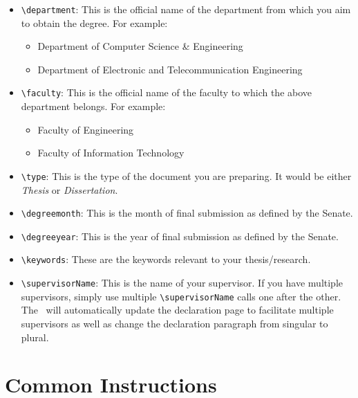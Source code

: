 \documentclass[12pt]{uomthesis}
\begin{document}
\begin{itemize}
       \begin{itemize}[noitemsep,topsep=0pt]
           \item Doctor of Philosophy
           \item \textbf{By Research Degrees:} Master of Science (Major Component Research) 
            \item \textbf{Taught Courses:} Master of Science in Project Management
       \end{itemize}
    \item\verb|\department|: This is the official name of the department from which you aim to obtain the degree. For example:
       \begin{itemize}[noitemsep,topsep=0pt]
           \item Department of Computer Science \& Engineering
           \item Department of Electronic and Telecommunication Engineering
       \end{itemize}
    \item\verb|\faculty|: This is the official name of the faculty to which the above department belongs. For example:
       \begin{itemize}[noitemsep,topsep=0pt]
           \item Faculty of Engineering
           \item Faculty of Information Technology
       \end{itemize}
    \item\verb|\type|: This is the type of the document you are preparing. It would be either \textit{Thesis} or \textit{Dissertation}. 
    \item\verb|\degreemonth|: This is the month of final submission as defined by the Senate.
    \item\verb|\degreeyear|: This is the year of final submission as defined by the Senate.
    \item\verb|\keywords|: These are the keywords relevant to your thesis/research.
    \item\verb|\supervisorName|: This is the name of your supervisor. If you have multiple supervisors, simply use multiple \verb|\supervisorName| calls one after the other. The~\TheClass{} will automatically update the declaration page to facilitate multiple supervisors as well as change the declaration paragraph from singular to plural.
\end{itemize}


\chapter{Common Instructions}
\end{document}
